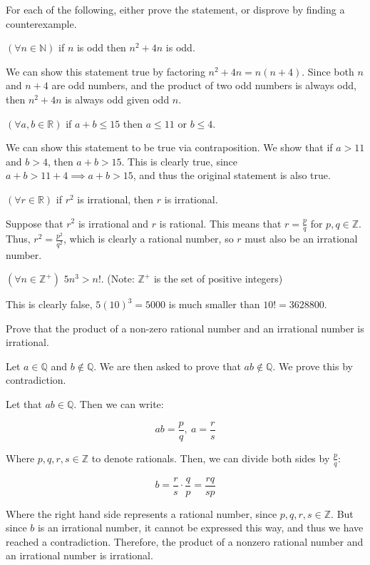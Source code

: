 \documentclass[11pt]{article}
\begin{document}
For each of the following, either prove the statement, or disprove by finding a counterexample.
\begin{Parts}
	\Part $(\forall n \in \mathbb{N})$ if $n$ is odd then $n^2 + 4n$ is odd.

    \begin{solution}
        We can show this statement true by factoring $n^2 + 4n = n(n+4)$. Since both $n$ and $n + 4$ are odd numbers, and the product of two odd numbers is always odd, then $n^2 + 4n$ is always odd given odd $n$.
    \end{solution}

	\Part $(\forall a, b \in \mathbb{R})$ if $a + b \le 15$ then $a \le 11$ or $b \le 4$.

    \begin{solution}
        We can show this statement to be true via contraposition. We show that if $a > 11$ and $b > 4$, then $a + b > 15$. This is clearly true, since $a + b > 11 + 4 \implies a + b > 15$, and thus the original statement is also true.
    \end{solution}


	\Part $(\forall r \in \mathbb{R})$ if $r^2$ is irrational, then $r$ is irrational.

\begin{solution}
    Suppose that $r^2$ is irrational and $r$ is rational. This means that $r =\frac{p}{q}$ for $p, q \in \mathbb Z$. Thus, $r^2 = \frac{p^2}{q^2}$, which is clearly a rational number, so $r$ must also be an irrational number.
\end{solution} 


	\Part $(\forall n \in \mathbb{Z}^+)$ $5n^3 > n!$. (Note: $\mathbb{Z}^+$ is the set of positive integers)

    \begin{solution}
    This is clearly false, $5(10)^3 = 5000$ is much smaller than $10! = 3628800$.
    \end{solution}
\end{Parts}

Prove that the product of a non-zero rational number and an irrational number is irrational.

\begin{solution}
    Let $a \in \mathbb Q$ and $b \notin \mathbb Q$. We are then asked to prove that $ab \notin \mathbb Q$. We prove this by contradiction.

    Let that $ab \in \mathbb Q$. Then we can write:

    \[ ab = \frac{p}{q}, \ a = \frac{r}{s}\]

    Where $p, q, r, s \in \mathbb Z$ to denote rationals. Then, we can divide both sides by $\frac{p}{q}$:

    \[ b = \frac{r}{s} \cdot \frac{q}{p} = \frac{rq}{sp}\] 

    Where the right hand side represents a rational number, since $p, q, r, s \in \mathbb Z$. But since $b$ is an irrational number, it cannot be expressed this way, and thus we have reached a contradiction. Therefore, the product of a nonzero rational number and an irrational number is irrational.
\end{solution}
\end{document}

